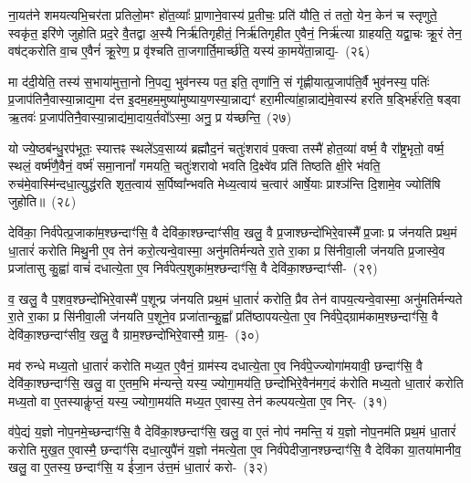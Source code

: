 ना॒यत॑ने शमयत्यभि॒चर॑ता प्रतिलो॒मꣳ हो॑त॒व्याः᳚ प्रा॒णाने॒वास्य॑ प्र॒तीचः॒ प्रति॑ यौति॒ तं ततो॒ येन॒ केन॑ च स्तृणुते॒ स्वकृ॑त॒ इरि॑णे जुहोति प्रद॒रे वै॒तद्वा अ॒स्यै निर्\mbox{}ऋ॑तिगृहीतं॒ निर्\mbox{}ऋ॑तिगृहीत ए॒वैनं॒ निर्\mbox{}ऋ॑त्या ग्राहयति॒ यद्वा॒चः क्रू॒रं तेन॒ वष॑ट्करोति वा॒च ए॒वैनं॑ क्रू॒रेण॒ प्र वृ॑श्चति ता॒जगार्ति॒मार्च्छ॑ति॒ यस्य॑ का॒मये॑ता॒न्नाद्य॒-~(२६)\ip

मा द॑दी॒येति॒ तस्य॑ स॒भाया॑मुत्ता॒नो नि॒पद्य॒ भुव॑नस्य पत॒ इति॒ तृणा॑नि॒ सं गृ॑ह्णीयात्प्र॒जा\-प॑ति॒र्वै भुव॑नस्य॒ पतिः॑ प्र॒जा\-प॑तिनै॒वास्या॒न्नाद्य॒मा द॑त्त इ॒दम॒हम॒मुष्या॑मुष्याय॒णस्या॒न्नाद्यꣳ॑ हरा॒मीत्या॑हा॒न्नाद्य॑मे॒वास्य॑ हरति ष॒ड्भिर्\mbox{}ह॑रति॒ षड्वा ऋ॒तवः॑ प्र॒जा\-प॑तिनै॒वास्या॒न्नाद्य॑मा॒दाय॒र्तवो᳚\-ऽस्मा॒ अनु॒ प्र य॑च्छन्ति॒~(२७)\ip

यो ज्ये॒ष्ठब॑न्धु॒रप॑भूतः॒ स्यात्तꣴ स्थले॑\-ऽव॒साय्य॑ ब्रह्मौद॒नं चतुः॑शरावं प॒क्त्वा तस्मै॑ होत॒व्या॑ वर्ष्म॒ वै रा᳚ष्ट्र॒भृतो॒ वर्ष्म॒ स्थलं॒ वर्ष्म॑णै॒वैनं॒ वर्ष्म॑ समा॒नानां᳚ गमयति॒ चतुः॑शरावो भवति दि॒क्ष्वे॑व प्रति॑ तिष्ठति क्षी॒रे भ॑वति॒ रुच॑मे॒वास्मि॑\-न्दधा॒त्युद्ध॑रति शृत॒त्वाय॑ स॒र्पिष्वा᳚न्भवति मेध्य॒त्वाय॑ च॒त्वार॑ आर्\mbox{}षे॒याः प्राश्ञ॑न्ति दि॒शामे॒व ज्योति॑षि जुहोति॥~(२८)\ip

{\anuvakamend[{ग्रा॒मी यु॑नक्ती॒ध्मः स्व ए॒वैना॑न॒न्नाद्यं॑ यच्छ॒न्त्येका॒न्नप॑ञ्चा॒शच्च॑}]}

देवि॑का॒ निर्व॑पेत्प्र॒जाका॑म॒श्छन्दाꣳ॑सि॒ वै देवि॑का॒श्छन्दाꣳ॑सीव॒ खलु॒ वै प्र॒जाश्छन्दो॑भि\-रे॒वास्मै᳚ प्र॒जाः प्र ज॑नयति प्रथ॒मं धा॒तारं॑ करोति मिथु॒नी ए॒व तेन॑ करो॒त्यन्वे॒वास्मा॒ अनु॑\-मतिर्मन्यते रा॒ते रा॒का प्र सि॑नीवा॒ली ज॑नयति प्र॒जास्वे॒व प्रजा॑तासु कु॒ह्वा॑ वाचं॑ दधात्ये॒ता ए॒व निर्व॑पेत्प॒शुका॑म॒श्छन्दाꣳ॑सि॒ वै देवि॑का॒श्छन्दाꣳ॑सी-~(२९)\ip

व॒ खलु॒ वै प॒शव॒श्छन्दो॑भिरे॒वास्मै॑ प॒शून्प्र ज॑नयति प्रथ॒मं धा॒तारं॑ करोति॒ प्रैव तेन॑ वापय॒त्यन्वे॒वास्मा॒ अनु॑मतिर्मन्यते रा॒ते रा॒का प्र सि॑नीवा॒ली ज॑नयति प॒शूने॒व प्रजा॑तान्कु॒ह्वा᳚ प्रति॑\-ष्ठापयत्ये॒ता ए॒व निर्व॑पे॒द्ग्राम॑काम॒श्छन्दाꣳ॑सि॒ वै देवि॑का॒श्छन्दाꣳ॑सीव॒ खलु॒ वै ग्राम॒श्छन्दो॑भिरे॒वास्मै॒ ग्राम॒-~(३०)\ip

मव॑ रुन्धे मध्य॒तो धा॒तारं॑ करोति मध्य॒त ए॒वैनं॒ ग्राम॑स्य दधात्ये॒ता ए॒व निर्व॑पे॒ज्ज्योगा॑मयावी॒ छन्दाꣳ॑सि॒ वै देवि॑का॒श्छन्दाꣳ॑सि॒ खलु॒ वा ए॒तम॒भि म॑न्यन्ते॒ यस्य॒ ज्योगा॒मय॑ति॒ छन्दो॑भिरे॒वैन॑मग॒दं क॑रोति मध्य॒तो धा॒तारं॑ करोति मध्य॒तो वा ए॒तस्याकॢ॑प्तं॒ यस्य॒ ज्योगा॒मय॑ति मध्य॒त ए॒वास्य॒ तेन॑ कल्पयत्ये॒ता ए॒व निर्-~(३१)\ip

व॑पे॒द्यं य॒ज्ञो नोप॒नमे॒च्छन्दाꣳ॑सि॒ वै देवि॑का॒श्छन्दाꣳ॑सि॒ खलु॒ वा ए॒तं नोप॑ नमन्ति॒ यं य॒ज्ञो नोप॒नम॑ति प्रथ॒मं धा॒तारं॑ करोति मुख॒त ए॒वास्मै॒ छन्दाꣳ॑सि दधा॒त्युपै॑नं य॒ज्ञो न॑मत्ये॒ता ए॒व निर्व॑पेदीजा॒नश्छन्दाꣳ॑सि॒ वै देवि॑का या॒तया॑मानीव॒ खलु॒ वा ए॒तस्य॒ छन्दाꣳ॑सि॒ य ई॑जा॒न उ॑त्त॒मं धा॒तारं॑ करो-~(३२)\ip

